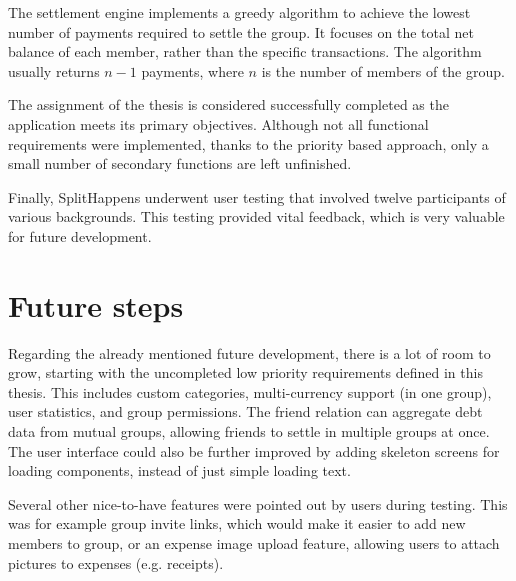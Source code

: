 \documentclass{ctuthesis}
\begin{document}
The settlement engine implements a greedy algorithm to achieve the lowest number of payments required to settle the group. It focuses on the total net balance of each member, rather than the specific transactions. The algorithm usually returns $n-1$ payments, where $n$ is the number of members of the group.

The assignment of the thesis is considered successfully completed as the application meets its primary objectives. Although not all functional requirements were implemented, thanks to the priority based approach, only a small number of secondary functions are left unfinished.

Finally, SplitHappens underwent user testing that involved twelve participants of various backgrounds. This testing provided vital feedback, which is very valuable for future development.

\section{Future steps}
Regarding the already mentioned future development, there is a lot of room to grow, starting with the uncompleted low priority requirements defined in this thesis. This includes custom categories, multi-currency support (in one group), user statistics, and group permissions. The friend relation can aggregate debt data from mutual groups, allowing friends to settle in multiple groups at once. The user interface could also be further improved by adding skeleton screens for loading components, instead of just simple loading text.

Several other nice-to-have features were pointed out by users during testing. This was for example group invite links, which would make it easier to add new members to group, or an expense image upload feature, allowing users to attach pictures to expenses (e.g. receipts).
\end{document}
